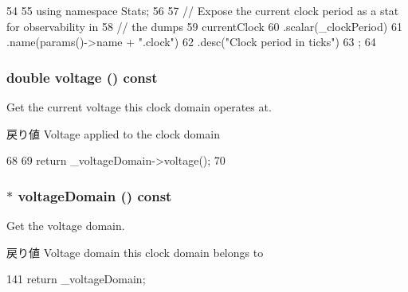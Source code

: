 \begin{DoxyCode}
54 {
55     using namespace Stats;
56 
57     // Expose the current clock period as a stat for observability in
58     // the dumps
59     currentClock
60         .scalar(_clockPeriod)
61         .name(params()->name + ".clock")
62         .desc("Clock period in ticks")
63         ;
64 }
\end{DoxyCode}
\hypertarget{classClockDomain_a3222f13284739dc636f7f10cd265c66f}{
\subsubsection[{voltage}]{\setlength{\rightskip}{0pt plus 5cm}double voltage () const}}
\label{classClockDomain_a3222f13284739dc636f7f10cd265c66f}
Get the current voltage this clock domain operates at.

\begin{DoxyReturn}{戻り値}
Voltage applied to the clock domain 
\end{DoxyReturn}



\begin{DoxyCode}
68 {
69     return _voltageDomain->voltage();
70 }
\end{DoxyCode}
\hypertarget{classClockDomain_a314e91ca0b9558a7f8466ffc0a28aa12}{
\subsubsection[{voltageDomain}]{$\ast$ voltageDomain () const}}
\label{classClockDomain_a314e91ca0b9558a7f8466ffc0a28aa12}
Get the voltage domain.

\begin{DoxyReturn}{戻り値}
Voltage domain this clock domain belongs to 
\end{DoxyReturn}



\begin{DoxyCode}
141 { return _voltageDomain; }
\end{DoxyCode}


